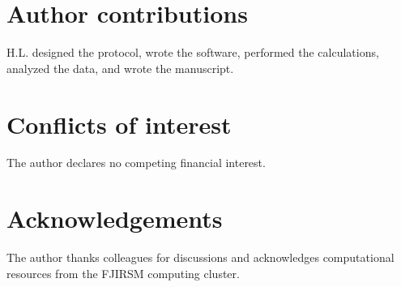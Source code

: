 \documentclass[11pt,a4paper]{article}
\begin{document}
\section*{Author contributions}

H.L. designed the protocol, wrote the software, performed the calculations, analyzed the data, and wrote the manuscript.

\section*{Conflicts of interest}

The author declares no competing financial interest.

\section*{Acknowledgements}

The author thanks colleagues for discussions and acknowledges computational resources from the FJIRSM computing cluster.



\end{document}
